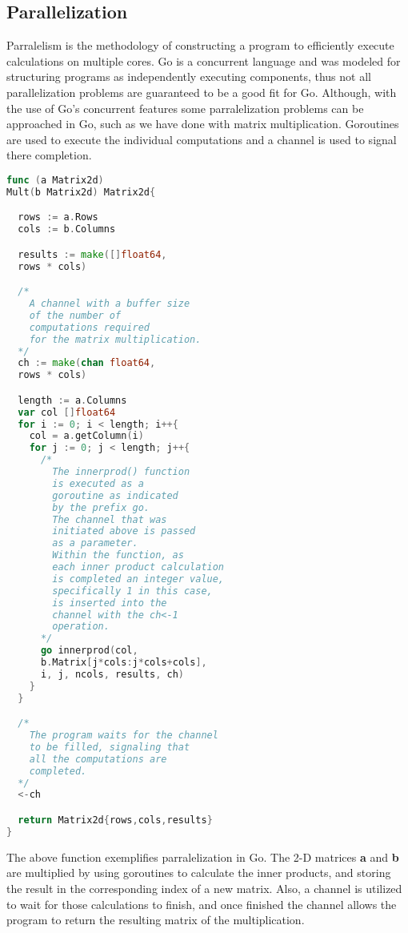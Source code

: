 \subsection{Parallelization}
Parralelism is the methodology of constructing a program to efficiently execute calculations on multiple cores. Go is a concurrent language and was modeled for structuring programs as independently executing components, thus not all parallelization problems are guaranteed to be a good fit for Go. Although, with the use of Go's concurrent features some parralelization problems can be approached in Go, such as we have done with matrix multiplication. Goroutines are used to execute the individual computations and a channel is used to signal there completion. \cite{website:go-lang-documentation}
\begin{lstlisting}[language=Go]
func (a Matrix2d) 
Mult(b Matrix2d) Matrix2d{

  rows := a.Rows
  cols := b.Columns

  results := make([]float64,
  rows * cols)

  /*
    A channel with a buffer size
    of the number of 
    computations required
    for the matrix multiplication.
  */
  ch := make(chan float64,
  rows * cols)

  length := a.Columns
  var col []float64
  for i := 0; i < length; i++{
    col = a.getColumn(i)
    for j := 0; j < length; j++{
      /*
        The innerprod() function
        is executed as a
        goroutine as indicated
        by the prefix go.
        The channel that was
        initiated above is passed
        as a parameter.
        Within the function, as
        each inner product calculation
        is completed an integer value,
        specifically 1 in this case,
        is inserted into the 
        channel with the ch<-1
        operation. 
      */
      go innerprod(col,
      b.Matrix[j*cols:j*cols+cols],
      i, j, ncols, results, ch)
    }
  }

  /*
    The program waits for the channel
    to be filled, signaling that
    all the computations are
    completed.
  */
  <-ch

  return Matrix2d{rows,cols,results}
}
\end{lstlisting}

The above function exemplifies parralelization in Go. The 2-D matrices \textbf{a} and \textbf{b} are multiplied by using goroutines to calculate the inner products, and storing the result in the corresponding index of a new matrix. Also, a channel is utilized to wait for those calculations to finish, and once finished the channel allows the program to return the resulting matrix of the multiplication. 
